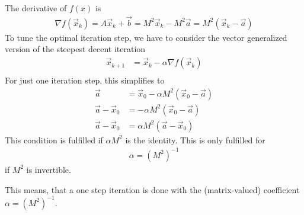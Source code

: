 \documentclass{article}
\begin{document}
The derivative of $f(x)$ is
\begin{align}
    \nabla f(\vec{x}_k) = A \vec{x}_k + \vec{b} = M^2 \vec{x}_k - M^2 \vec{a} = M^2 (\vec{x}_k - \vec{a})
\end{align}
To tune the optimal iteration step, we have to consider the vector generalized version of the steepest decent iteration
\begin{align*}
\vec{x}_{k+1} &= \vec{x}_k - \alpha \nabla f(\vec{x}_k) \\
\end{align*}
For just one iteration step, this simplifies to
\begin{align*}
\vec{a} &= \vec{x}_0 - \alpha M^2 (\vec{x}_0 - \vec{a}) \\
\vec{a} - \vec{x}_0 &= -\alpha M^2 (\vec{x}_0 - \vec{a}) \\
\vec{a} - \vec{x}_0 &= \alpha M^2 (\vec{a} - \vec{x}_0)
\end{align*}
This condition is fulfilled if $\alpha M^2$ is the identity. This is only fulfilled for
\begin{align}
    \alpha = (M^2)^{-1}
\end{align}
if $M^2$ is invertible.

This means, that a one step iteration is done with the (matrix-valued) coefficient $\alpha=(M^2)^{-1}$.
\end{document}
